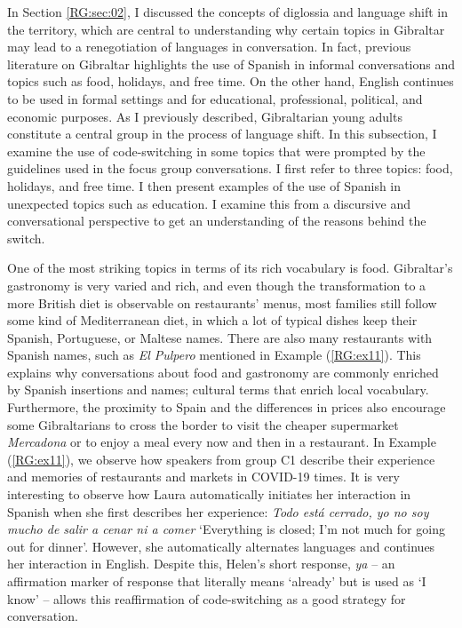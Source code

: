 \documentclass[output=paper]{langscibook}
\begin{document}
In Section \ref{RG:sec:02}, I discussed the concepts of diglossia and language shift in the territory, which are central to understanding why certain topics in Gibraltar may lead to a renegotiation of languages in conversation. In fact, previous literature on Gibraltar highlights the use of Spanish in informal conversations and topics \citep{moyer_analysis_1993} such as food, holidays, and free time. On the other hand, English continues to be used in formal settings and for educational, professional, political, and economic purposes. As I previously described, Gibraltarian young adults constitute a central group in the process of language shift. In this subsection, I examine the use of code-switching in some topics that were prompted by the guidelines used in the focus group conversations. I first refer to three topics: food, holidays, and free time. I then present examples of the use of Spanish in unexpected topics such as education. I examine this from a discursive and conversational perspective to get an understanding of the reasons behind the switch.

One of the most striking topics in terms of its rich vocabulary is food. Gibraltar’s gastronomy is very varied and rich, and even though the transformation to a more British diet is observable on restaurants’ menus, most families still follow some kind of Mediterranean diet, in which a lot of typical dishes keep their Spanish, Portuguese, or Maltese names. There are also many restaurants with Spanish names, such as \textit{El Pulpero} mentioned in Example (\ref{RG:ex11}). This explains why conversations about food and gastronomy are commonly enriched by Spanish insertions and names; cultural terms that enrich local vocabulary. Furthermore, the proximity to Spain and the differences in prices also encourage some Gibraltarians to cross the border to visit the cheaper supermarket \textit{Mercadona} or to enjoy a meal every now and then in a restaurant. In Example (\ref{RG:ex11}), we observe how speakers from group C1 describe their experience and memories of restaurants and markets in COVID-19 times. It is very interesting to observe how Laura automatically initiates her interaction in Spanish when she first describes her experience: \textit{Todo está cerrado, yo no soy mucho de salir a cenar ni a comer} ‘Everything is closed; I’m not much for going out for dinner’. However, she automatically alternates languages and continues her interaction in English. Despite this, Helen’s short response, \textit{ya} – an affirmation marker of response that literally means ‘already’ but is used as ‘I know’ – allows this reaffirmation of code-switching as a good strategy for conversation.
\end{document}
